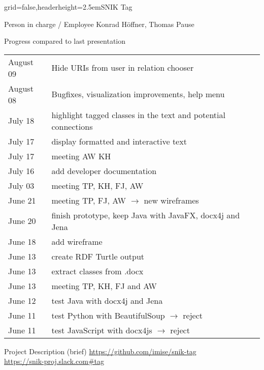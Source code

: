 \documentclass[]{kiesgrube}
\begin{document}
\begin{poster}%
{grid=false,headerheight=2.5em}{}{SNIK Tag}{}

\begin{posterbox}[name=person,column=0,row=0]{Person in charge / Employee}
Konrad Höffner, Thomas Pause
\end{posterbox}
\begin{posterbox}[name=progress,below=person]{Progress compared to last presentation}
\footnotesize
\begin{tabulary}{\textwidth}{lL}
August 09	&Hide URIs from user in relation chooser\\
August 08	&Bugfixes, visualization improvements, help menu\\
July 18 &highlight tagged classes in the text and potential connections\\
July 17	&display formatted and interactive text\\
July 17	&meeting AW KH\\
July 16	&add developer documentation\\
July 03	&meeting TP, KH, FJ, AW\\
June 21	&meeting TP, FJ, AW $\rightarrow$ new wireframes\\
June 20	&finish prototype, keep Java with JavaFX, docx4j and Jena\\
June 18 &add wireframe\\
June 13 &create RDF Turtle output\\
June 13	&extract classes from .docx\\
June 13 &meeting TP, KH, FJ and AW\\
June 12	&test Java with docx4j and Jena\\
June 11	&test Python with BeautifulSoup $\rightarrow$ reject\\
June 11	&test JavaScript with docx4js $\rightarrow$ reject\\
\end{tabulary}
\end{posterbox}
\begin{posterbox}[name=description,column=1,row=0]{Project Description (brief)}
\url{https://github.com/imise/snik-tag}\\
\url{https://snik-proj.slack.com#tag}
\end{posterbox}

\end{poster}
\end{document}
